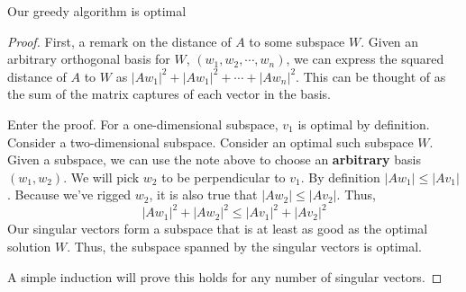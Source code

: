 \documentclass{hw}
\renewcommand\emph[1]{{\bf\color{Blue}#1}}
\begin{document}
\begin{claim}
  Our greedy algorithm is optimal
\begin{proof}
First, a remark on the distance of $A$ to some subspace $W$. Given an arbitrary
orthogonal basis for $W$, $(w_1, w_2, \cdots, w_n)$, we can express the squared
distance of $A$ to $W$ as $|Aw_1|^2 + |Aw_1|^2 + \cdots + |Aw_n|^2$. This can
be thought of as the sum of the matrix captures of each vector in the basis.

Enter the proof. For a one-dimensional subspace, $v_1$ is optimal by
definition. Consider a two-dimensional subspace. Consider an optimal such
subspace $W$. Given a subspace, we can use the note above to choose an
\emph{arbitrary} basis $(w_1, w_2)$. We will pick $w_2$ to be perpendicular to
$v_1$. By definition $|Aw_1| \leq |Av_1|$. Because we've rigged $w_2$, it is
also true that $|Aw_2| \leq |Av_2|$. Thus,
\[
  |Aw_1|^2 + |Aw_2|^2 \leq |Av_1|^2 + |Av_2|^2
\]
Our singular vectors form a subspace that is at least as good as the optimal
solution $W$. Thus, the subspace spanned by the singular vectors is optimal. 

A simple induction will prove this holds for any number of singular vectors.
\end{proof}
\end{claim}
\end{document}
